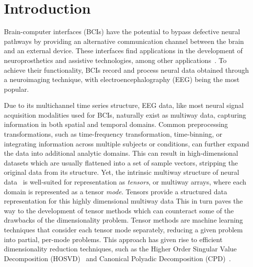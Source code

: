 

\section{Introduction}
Brain-computer interfaces (BCIs) have the potential to bypass
defective neural pathways by providing an alternative communication channel
between the brain and an external device.
These interfaces find applications in the development of neuroprosthetics and assistive
technologies, among other applications~\cite{Wolpaw2020}.
To achieve their functionality, BCIs record and process neural data obtained through
a neuroimaging technique, with electroencephalography (EEG) being the most popular.

Due to its multichannel time series structure, EEG data, like most neural
signal acquisition modalities used for BCIs, naturally exist as multiway data,
capturing information in both spatial and temporal domains.
Common preprocessing transformations, such as time-frequency transformation,
time-binning, or integrating information across multiple subjects or conditions,
can further expand the data into additional analytic domains.
This can result in high-dimensional datasets which are usually flattened into a
set of sample vectors, stripping the original data from its structure.
Yet, the intrinsic multiway structure of neural data~\cite{Erol2022} is
well-suited for representation as \emph{tensors}, or multiway arrays, where
each domain is represented as a tensor \emph{mode}.
Tensors provide a structured data representation for this highly dimensional
multiway data
This in turn paves the way to the development of tensor methods which can
counteract some of the drawbacks of the dimensionality problem.
Tensor methods are machine learning techniques that  consider each tensor mode
separately, reducing a given problem into partial, per-mode problems.
This approach has given rise to efficient dimensionality reduction techniques,
such as the Higher Order Singular Value Decomposition
(HOSVD)~\cite{DeLathauwer2000,SoleCasals2018}
and Canonical Polyadic Decomposition
(CPD)~\cite{Hitchcock1927,Nazarpour2006}.

